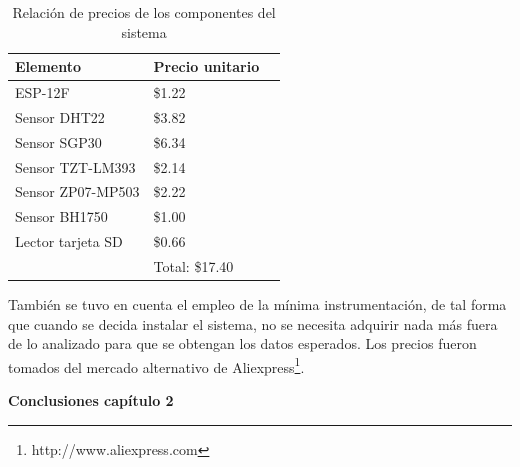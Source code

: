\begin{table}[H]
    \centering
    \caption{Relación de precios de los componentes del sistema}
    \label{tab:precios_componentes}
    \begin{tabular}{|l|l|r|}
    \hline
    \cellcolor[HTML]{9698ED}Elemento    & \cellcolor[HTML]{9698ED}Precio unitario  \\ \hline
    ESP-12F                             & \$1.22                                      \\ \hline
    Sensor DHT22                        & \$3.82                                   \\ \hline
    Sensor SGP30                        & \$6.34                                   \\ \hline
    Sensor TZT-LM393                    & \$2.14                                   \\ \hline
    Sensor ZP07-MP503                   & \$2.22                                   \\ \hline
    Sensor BH1750                       & \$1.00                                   \\ \hline
    Lector tarjeta SD                   & \$0.66                                   \\ \hline
                                        & Total: \$17.40                                  \\ \hline
    \end{tabular}
\end{table}

También se tuvo en cuenta el empleo de la mínima instrumentación, de tal forma que cuando se decida instalar el sistema, no se necesita adquirir nada más fuera de lo analizado para que se obtengan los datos esperados.
Los precios fueron tomados del mercado alternativo de Aliexpress\footnote{http://www.aliexpress.com}.\\

        \textbf{\Large Conclusiones capítulo 2}\newline
